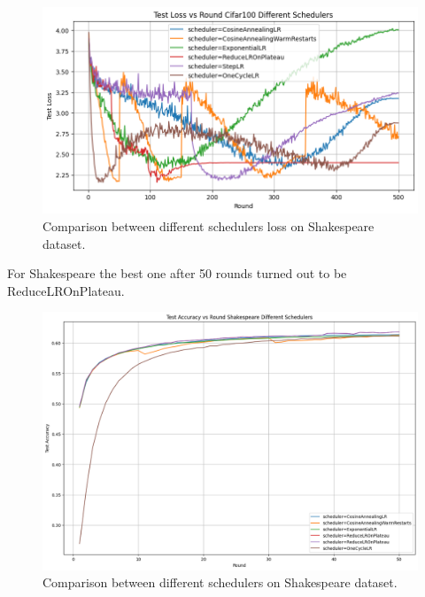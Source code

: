 \documentclass[10pt,twocolumn,letterpaper]{article}
\begin{document}
\begin{figure}[h]
\centering
\includegraphics[width=\linewidth]{images/cifar_loss.png}
\caption{Comparison between different schedulers loss on Shakespeare dataset.}
\label{fig:short-b}
\end{figure}
For Shakespeare the best one after 50 rounds turned out to be ReduceLROnPlateau.

\begin{figure}[h]
\centering
\includegraphics[width=\linewidth]{images/graph_shakespeare.png}
\caption{Comparison between different schedulers on Shakespeare dataset.}
\label{fig:short-b}
\end{figure}
\end{document}
